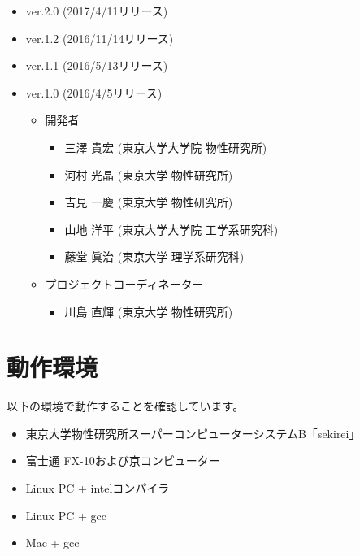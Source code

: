 \begin{itemize}
\item{ver.2.0 (2017/4/11リリース)}
\item{ver.1.2 (2016/11/14リリース)}
\item{ver.1.1 (2016/5/13リリース)}
\item{ver.1.0 (2016/4/5リリース)}
\begin{itemize}
\item{開発者}
	\begin{itemize}
	\item{三澤 貴宏 (東京大学大学院 物性研究所)}
	\item{河村 光晶 (東京大学 物性研究所)}
	\item{吉見 一慶 (東京大学 物性研究所)}
	\item{山地 洋平 (東京大学大学院 工学系研究科)}
	\item{藤堂 眞治 (東京大学 理学系研究科)}
	\end{itemize}
\item{プロジェクトコーディネーター}
	\begin{itemize}
	\item{川島 直輝 (東京大学 物性研究所)}
	\end{itemize}
\end{itemize}

\end{itemize}


\section{動作環境}
 以下の環境で動作することを確認しています。

\begin{itemize}
\item 東京大学物性研究所スーパーコンピューターシステムB「sekirei」
\item 富士通 FX-10および京コンピューター
\item Linux PC + intelコンパイラ
\item Linux PC + gcc
\item Mac + gcc
\end{itemize}
